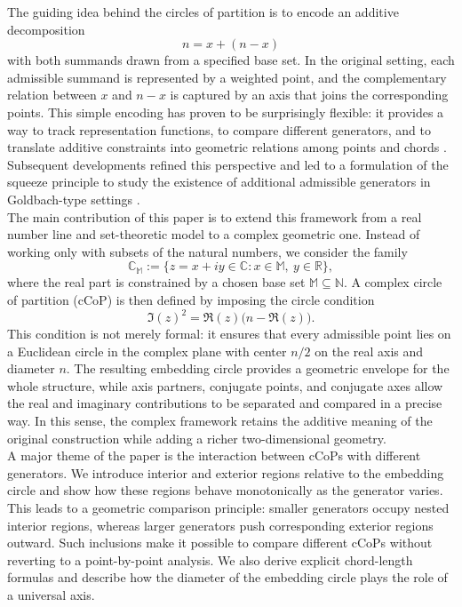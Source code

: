 \documentclass[12pt]{amsart}
\theoremstyle{definition}
\theoremstyle{remark}
\numberwithin{equation}{section}
\begin{document}
The guiding idea behind the circles of partition is to encode an additive decomposition
$$
n=x+(n-x)
$$
with both summands drawn from a specified base set. In the original setting, each admissible summand is represented by a weighted point, and the complementary relation between $x$ and $n-x$ is captured by an axis that joins the corresponding points. This simple encoding has proven to be surprisingly flexible: it provides a way to track representation functions, to compare different generators, and to translate additive constraints into geometric relations among points and chords \cite{CoP}. Subsequent developments refined this perspective and led to a formulation of the squeeze principle to study the existence of additional admissible generators in Goldbach-type settings \cite{Goldbach,Squeeze}.\\

The main contribution of this paper is to extend this framework from a real number line and set-theoretic model to a complex geometric one. Instead of working only with subsets of the natural numbers, we consider the family
$$
\mathbb{C}_{\mathbb{M}}:=\{z=x+iy\in\mathbb{C}:x\in\mathbb{M},\ y\in\mathbb{R}\},
$$
where the real part is constrained by a chosen base set $\mathbb{M}\subseteq\mathbb{N}$. A complex circle of partition (cCoP) is then defined by imposing the circle condition
$$
\Im(z)^2=\Re(z)\bigl(n-\Re(z)\bigr).
$$
This condition is not merely formal: it ensures that every admissible point lies on a Euclidean circle in the complex plane with center $n/2$ on the real axis and diameter $n$. The resulting embedding circle provides a geometric envelope for the whole structure, while axis partners, conjugate points, and conjugate axes allow the real and imaginary contributions to be separated and compared in a precise way. In this sense, the complex framework retains the additive meaning of the original construction while adding a richer two-dimensional geometry.\\

A major theme of the paper is the interaction between cCoPs with different generators. We introduce interior and exterior regions relative to the embedding circle and show how these regions behave monotonically as the generator varies. This leads to a geometric comparison principle: smaller generators occupy nested interior regions, whereas larger generators push corresponding exterior regions outward. Such inclusions make it possible to compare different cCoPs without reverting to a point-by-point analysis. We also derive explicit chord-length formulas and describe how the diameter of the embedding circle plays the role of a universal axis.\\
\end{document}
